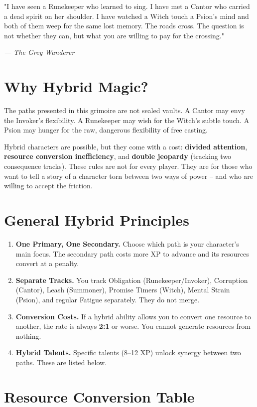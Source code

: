 \documentclass[10pt,a5paper]{book}
\begin{document}
\epigraph{"I have seen a Runekeeper who learned to sing. I have met a Cantor who carried a dead spirit on her shoulder. I have watched a Witch touch a Psion's mind and both of them weep for the same lost memory. The roads cross. The question is not whether they can, but what you are willing to pay for the crossing."}{\textit{--- The Grey Wanderer}}

\section*{Why Hybrid Magic?}

The paths presented in this grimoire are not sealed vaults. A Cantor may envy the Invoker's flexibility. A Runekeeper may wish for the Witch's subtle touch. A Psion may hunger for the raw, dangerous flexibility of free casting.

Hybrid characters are possible, but they come with a cost: \textbf{divided attention}, \textbf{resource conversion inefficiency}, and \textbf{double jeopardy} (tracking two consequence tracks). These rules are not for every player. They are for those who want to tell a story of a character torn between two ways of power -- and who are willing to accept the friction.

\section*{General Hybrid Principles}

\begin{enumerate}
    \item \textbf{One Primary, One Secondary.} Choose which path is your character's main focus. The secondary path costs more XP to advance and its resources convert at a penalty.
    \item \textbf{Separate Tracks.} You track Obligation (Runekeeper/Invoker), Corruption (Cantor), Leash (Summoner), Promise Timers (Witch), Mental Strain (Psion), and regular Fatigue separately. They do not merge.
    \item \textbf{Conversion Costs.} If a hybrid ability allows you to convert one resource to another, the rate is always \textbf{2:1} or worse. You cannot generate resources from nothing.
    \item \textbf{Hybrid Talents.} Specific talents (8--12 XP) unlock synergy between two paths. These are listed below.
\end{enumerate}

\section*{Resource Conversion Table}
\end{document}
